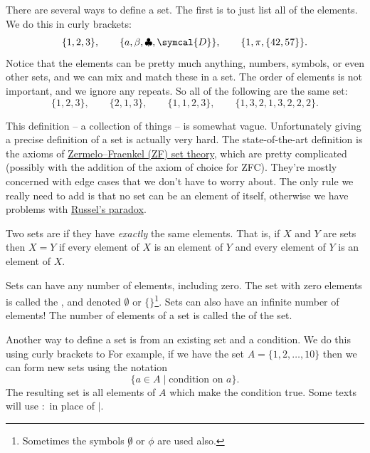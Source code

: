 \documentclass[fleqn]{LectureClass/LectureClass}
\begin{document}
    There are several ways to define a set.
    The first is to just list all of the elements.
    We do this in curly brackets:
    \begin{equation}
        \{1, 2, 3\}, \qquad \{a, \beta, \clubsuit, \symcal{D}\}, \qquad \{1, \pi, \{42, 57\}\}.
    \end{equation}
    Notice that the elements can be pretty much anything, numbers, symbols, or even other sets, and we can mix and match these in a set.
    The order of elements is not important, and we ignore any repeats.
    So all of the following are the same set:
    \begin{equation}
        \{1, 2, 3\}, \qquad \{2, 1, 3\}, \qquad \{1, 1, 2, 3\}, \qquad \{1, 3, 2, 1, 3, 2, 2, 2\}.
    \end{equation}
    
    \begin{remark}{}{}
        This definition -- a collection of things -- is somewhat vague.
        Unfortunately giving a precise definition of a set is actually very hard.
        The state-of-the-art definition is the axioms of \href{https://en.wikipedia.org/wiki/Zermelo%E2%80%93Fraenkel_set_theory}{Zermelo--Fraenkel (ZF) set theory}, which are pretty complicated (possibly with the addition of the axiom of choice for ZFC).
        They're mostly concerned with edge cases that we don't have to worry about.
        The only rule we really need to add is that no set can be an element of itself, otherwise we have problems with \href{https://en.wikipedia.org/wiki/Russell%27s_paradox}{Russel's paradox}.
    \end{remark}
    
    Two sets are  if they have \emph{exactly} the same elements.
    That is, if \(X\) and \(Y\) are sets then \(X = Y\) if every element of \(X\) is an element of \(Y\) and every element of \(Y\) is an element of \(X\).
    
    Sets can have any number of elements, including zero.
    The set with zero elements is called the , and denoted \(\emptyset\) or \(\{\}\)\footnote{Sometimes the symbols \(\not0\) or \(\phi\) are used also.}.
    Sets can also have an infinite number of elements!
    The number of elements of a set is called the  of the set.
    
    Another way to define a set is from an existing set and a condition.
    We do this using curly brackets to 
    For example, if we have the set \(A = \{1, 2, \dotsc, 10\}\) then we can form new sets using the notation
    \begin{equation}
        \{a \in A \mid \text{condition on } a\}.
    \end{equation}
    The resulting set is all elements of \(A\) which make the condition true.
    Some texts will use \(:\) in place of \(\mid\).
    
\end{document}
